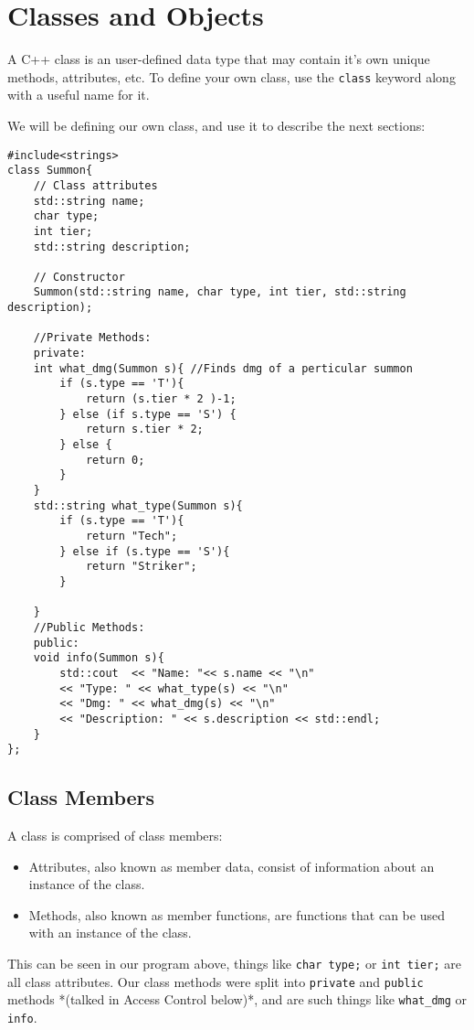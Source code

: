 \chapter{Classes and Objects}

A C++ class is an user-defined data type that may contain it's own unique methods, attributes, etc. 
To define your own class, use the \verb!class! keyword along with a useful name for it. 

We will be defining our own class, and use it to describe the next sections: 

\begin{verbatim}
#include<strings>
class Summon{
    // Class attributes
    std::string name; 
    char type; 
    int tier; 
    std::string description; 

    // Constructor 
    Summon(std::string name, char type, int tier, std::string description); 

    //Private Methods:
    private:
    int what_dmg(Summon s){ //Finds dmg of a perticular summon
        if (s.type == 'T'){
            return (s.tier * 2 )-1; 
        } else (if s.type == 'S') {
            return s.tier * 2;
        } else {
            return 0;
        }
    }
    std::string what_type(Summon s){
        if (s.type == 'T'){
            return "Tech"; 
        } else if (s.type == 'S'){
            return "Striker";
        }

    }
    //Public Methods: 
    public: 
    void info(Summon s){
        std::cout  << "Name: "<< s.name << "\n" 
        << "Type: " << what_type(s) << "\n" 
        << "Dmg: " << what_dmg(s) << "\n" 
        << "Description: " << s.description << std::endl;
    }
};

\end{verbatim}

\section{Class Members}
A class is comprised of class members:
\begin{itemize}
    \item Attributes, also known as member data, consist of information about an instance of the class.
    \item Methods, also known as member functions, are functions that can be used with an instance of the class.
\end{itemize}


This can be seen in our program above, things like \verb!char type;! or \verb!int tier;! are all class attributes. 
Our class methods were split into \verb!private! and \verb!public! methods *(talked in Access Control below)*, and are 
such things like \verb!what_dmg! or \verb!info!. 

